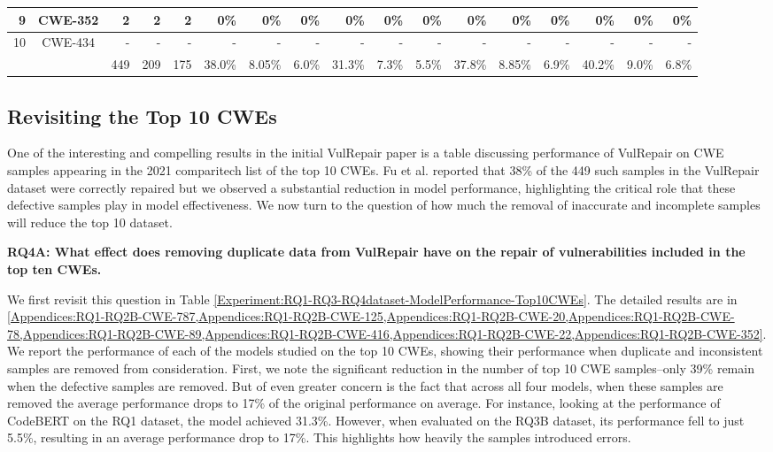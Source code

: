 \begin{table}
{\begin{tabular}{|r|c|r|r|r|r|r|r|r|r|r|r|r|r|r|r|r|}
    \hline
    9       & {\footnotesize CWE-352}       &2&2&2                   &0\%&0\%&0\%             &0\% &0\%&0\%           &0\%&0\%&0\%              &0\%&0\%&0\%\\
    \hline
    10      & {\footnotesize CWE-434}       &-&-&-                   &-&-&-                   &-&-&-                  &-&- &-                   &-&- &-\\
    \hline
            &                               &449&209&175             &38.0\%&8.05\%&6.0\%     &31.3\%&7.3\% &5.5\%    &37.8\%&8.85\%&\cellcolor[gray]{0.8}6.9\%      &40.2\%&9.0\% &6.8\%\\   
  \hline
\end{tabular}
}
\end{table}



\subsection{Revisiting the Top 10 CWEs}

One of the interesting and compelling results in the initial VulRepair paper\cite{fu2022vulrepair} is a table discussing performance of VulRepair on CWE samples appearing in the 2021 comparitech list of the top 10 CWEs\cite{top10}.
Fu et al. reported that 38\% of the 449 such samples in the VulRepair dataset were correctly repaired but we observed a substantial reduction in model performance, highlighting the critical role that these defective samples play in model effectiveness. We now turn to the question of how much the removal of inaccurate and incomplete samples will reduce the top 10 dataset.


\textbf{RQ4A: What effect does removing duplicate data from VulRepair have on the repair of vulnerabilities included in the top ten CWEs.}

We first revisit this question in Table \ref{Experiment:RQ1-RQ3-RQ4dataset-ModelPerformance-Top10CWEs}.
The detailed results are in \cref{Appendices:RQ1-RQ2B-CWE-787,Appendices:RQ1-RQ2B-CWE-125,Appendices:RQ1-RQ2B-CWE-20,Appendices:RQ1-RQ2B-CWE-78,Appendices:RQ1-RQ2B-CWE-89,Appendices:RQ1-RQ2B-CWE-416,Appendices:RQ1-RQ2B-CWE-22,Appendices:RQ1-RQ2B-CWE-352}.
We report the performance of each of the models studied on the top 10 CWEs, showing their performance when duplicate and inconsistent samples are removed from consideration.
First, we note the significant reduction in the number of top 10 CWE samples--only 39\% remain when the defective samples are removed.
But of even greater concern is the fact that across all four models, when these samples are removed the average performance drops to 
17\% of the original performance on average.
For instance, looking at the performance of CodeBERT on the RQ1 dataset, the model achieved 31.3\%. However, when evaluated on the RQ3B dataset, its performance fell to just 5.5\%, resulting in an average performance drop to 17\%. This highlights how heavily the samples introduced errors.

